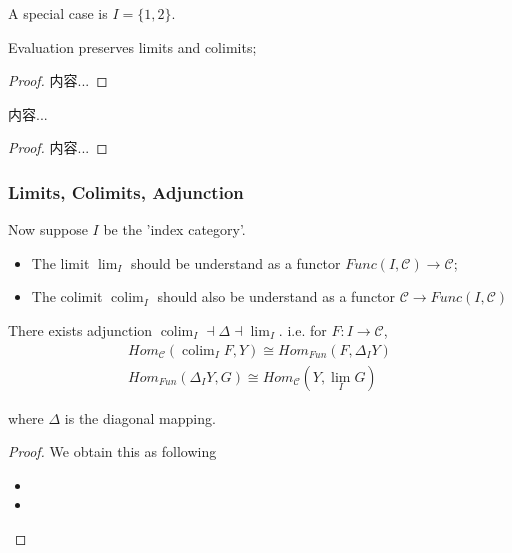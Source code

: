 \documentclass[Total.tex]{subfiles}
\begin{document}
				A special case is $I=\{1,2\}$.
				
				\begin{proposition}
					Evaluation preserves limits and colimits;
				\end{proposition}
				\begin{proof}
					内容...
				\end{proof}
				
				\begin{corollary}
					内容...
				\end{corollary}
				\begin{proof}
					内容...
				\end{proof}
				
				\subsubsection{Limits, Colimits, Adjunction}
				\begin{Def}
					Now suppose $I$ be the 'index category'. 
					\begin{itemize}
						\item The limit $\lim_I$ should be understand as a functor $Func(I,\mathcal{C})\rightarrow \mathcal{C}$;
						\item The colimit $\operatorname{colim}_I$ should also be understand as a functor $\mathcal{C}\rightarrow Func(I,\mathcal{C})$
					\end{itemize}
				\end{Def}
				
				\begin{proposition}
					There exists adjunction $\operatorname{colim}_I\dashv \Delta\dashv \lim_I$. i.e. for $F:I\rightarrow \mathcal{C}$,
					\begin{gather*}
						Hom_{\mathcal{C}}(\operatorname{colim}_I F,Y)\cong Hom_{Fun}(F,\Delta_I Y)\\
						Hom_{Fun}(\Delta_I Y,G)\cong Hom_\mathcal{C}(Y,\lim_I G)
					\end{gather*}
					
					where $\Delta$ is the diagonal mapping.
				\end{proposition}
				\begin{proof}
					We obtain this as following
					\begin{itemize}
						\item 
						\item 
					\end{itemize}
				\end{proof}
				
\end{document}
